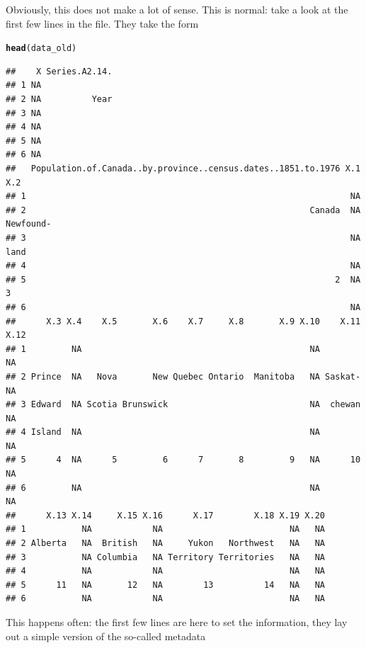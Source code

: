 \documentclass[aspectratio=169]{beamer}\usepackage[]{graphicx}\usepackage[]{xcolor}
\makeatletter
\newcommand{\hldef}[1]{\textcolor[rgb]{0.345,0.345,0.345}{#1}}%
\newcommand{\hlkwd}[1]{\textcolor[rgb]{0.737,0.353,0.396}{\textbf{#1}}}%
\newenvironment{kframe}{%
 \def\at@end@of@kframe{}%
 \ifinner\ifhmode%
  \def\at@end@of@kframe{\end{minipage}}%
  \begin{minipage}{\columnwidth}%
 \fi\fi%
 \def\FrameCommand##1{\hskip\@totalleftmargin \hskip-\fboxsep
 \colorbox{shadecolor}{##1}\hskip-\fboxsep
     \hskip-\linewidth \hskip-\@totalleftmargin \hskip\columnwidth}%
 \MakeFramed {\advance\hsize-\width
   \@totalleftmargin\z@ \linewidth\hsize
   \@setminipage}}%
 {\par\unskip\endMakeFramed%
 \at@end@of@kframe}
\newenvironment{knitrout}{}{} %
\makeatother
\begin{document}
\begin{frame}[fragile]
Obviously, this does not make a lot of sense. This is normal: take a look at the first few lines in the file. They take the form
\begin{knitrout}
\color{fgcolor}\begin{kframe}
\begin{alltt}
\hlkwd{head}\hldef{(data_old)}
\end{alltt}
\begin{verbatim}
##    X Series.A2.14.
## 1 NA              
## 2 NA          Year
## 3 NA              
## 4 NA              
## 5 NA              
## 6 NA              
##   Population.of.Canada..by.province..census.dates..1851.to.1976 X.1       X.2
## 1                                                                NA          
## 2                                                        Canada  NA Newfound-
## 3                                                                NA      land
## 4                                                                NA          
## 5                                                             2  NA         3
## 6                                                                NA          
##      X.3 X.4    X.5       X.6    X.7     X.8       X.9 X.10    X.11 X.12
## 1         NA                                             NA           NA
## 2 Prince  NA   Nova       New Quebec Ontario  Manitoba   NA Saskat-   NA
## 3 Edward  NA Scotia Brunswick                            NA  chewan   NA
## 4 Island  NA                                             NA           NA
## 5      4  NA      5         6      7       8         9   NA      10   NA
## 6         NA                                             NA           NA
##      X.13 X.14     X.15 X.16      X.17        X.18 X.19 X.20
## 1           NA            NA                         NA   NA
## 2 Alberta   NA  British   NA     Yukon   Northwest   NA   NA
## 3           NA Columbia   NA Territory Territories   NA   NA
## 4           NA            NA                         NA   NA
## 5      11   NA       12   NA        13          14   NA   NA
## 6           NA            NA                         NA   NA
\end{verbatim}
\end{kframe}
\end{knitrout}
\vfill
This happens often: the first few lines are here to set the information, they lay out a simple version of the so-called metadata
\end{frame}
\end{document}

